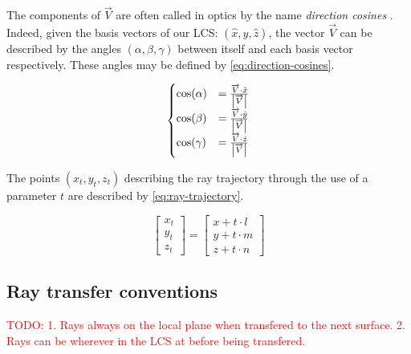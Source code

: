 The components of $\overrightarrow{V}$ are often called in optics by the name
\emph{direction cosines} \cite{mathworld:direction-cosine}. Indeed, given the
basis vectors of our \gls{LCS}: $(\hat{x}, \hat{y}, \hat{z})$, the vector
$\overrightarrow{V}$ can be described by the angles $(\alpha, \beta, \gamma)$
between itself and each basis vector respectively. These angles may be defined
by \cref{eq:direction-cosines}.

\begin{equation} \label{eq:direction-cosines}
\begin{cases}
\cos(\alpha) &= \frac{\overrightarrow{V} \cdot \hat{x}}
                     {\abs{\overrightarrow{V}}} \\
\cos(\beta) &= \frac{\overrightarrow{V} \cdot \hat{y}}
                    {\abs{\overrightarrow{V}}} \\
\cos(\gamma) &= \frac{\overrightarrow{V} \cdot \hat{z}}
                     {\abs{\overrightarrow{V}}}
\end{cases}
\end{equation}

The points $(x_t, y_t, z_t)$ describing the ray trajectory through the use of a parameter $t$
are described by \cref{eq:ray-trajectory}.

\begin{equation} \label{eq:ray-trajectory}
\begin{bmatrix}
x_t \\ y_t \\ z_t
\end{bmatrix} =
\begin{bmatrix}
x + t \cdot l \\
y + t \cdot m \\
z + t \cdot n
\end{bmatrix}
\end{equation}

\subsection{Ray transfer conventions}
\textcolor{red}{TODO:
1. Rays always on the local plane when transfered to the next surface.
2. Rays can be wherever in the LCS at before being transfered.}

